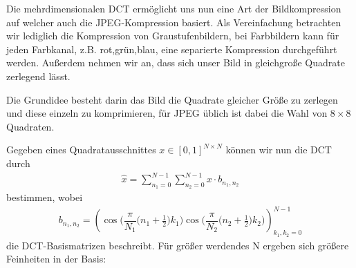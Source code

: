 Die mehrdimensionalen DCT ermöglicht uns nun eine Art der Bildkompression auf welcher auch die
JPEG-Kompression basiert. Als Vereinfachung betrachten wir lediglich die Kompression von Graustufenbildern, 
bei Farbbildern kann für jeden Farbkanal, z.B. rot,grün,blau, eine separierte Kompression
durchgeführt werden. Außerdem nehmen wir an, dass sich unser Bild in gleichgroße Quadrate zerlegend
lässt.

Die Grundidee besteht darin das Bild die Quadrate gleicher Größe zu zerlegen und diese einzeln zu
komprimieren, für JPEG üblich ist dabei die Wahl von $8\times 8$ Quadraten.

Gegeben eines Quadratausschnittes $x\in[0,1]^{N\times N}$ können wir nun die DCT durch
%
\begin{align*}
  \hat{x} = \sum_{n_1=0}^{N-1}\sum_{n_2=0}^{N-1} x\cdot b_{n_1,n_2}
\end{align*}
%
bestimmen, wobei
%
\begin{align*}
  b_{n_1,n_2} = \left(\cos\Big(\dfrac{\pi}{N_1}\big(n_1+\tfrac{1}{2}\big)k_1\Big)
  \cos\Big(\dfrac{\pi}{N_2}\big(n_2+\tfrac{1}{2}\big)k_2\Big)\right)_{k_1,k_2=0}^{N-1}
\end{align*}
%
die DCT-Basismatrizen beschreibt. Für größer werdendes N ergeben sich größere Feinheiten in der
Basis:

